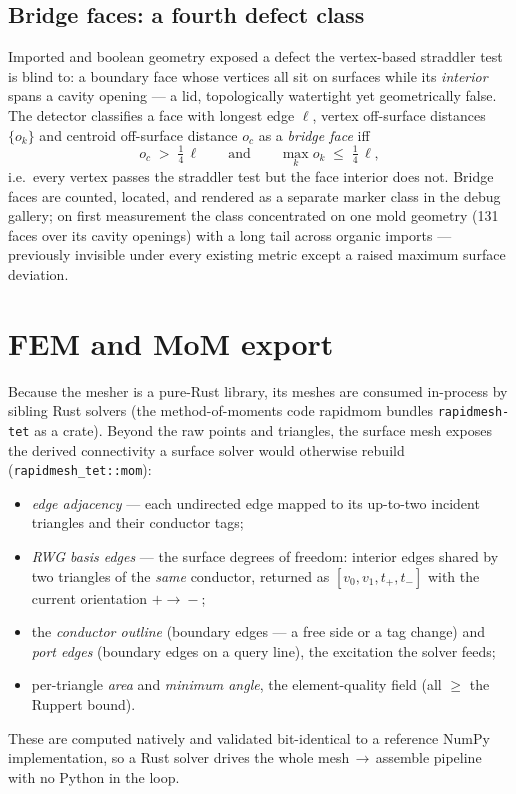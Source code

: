 \documentclass[11pt,a4paper]{article}
\numberwithin{equation}{section}
\DeclareRobustCommand{\code}[1]{\texttt{#1}}
\begin{document}
\subsection{Bridge faces: a fourth defect class}
Imported and boolean geometry exposed a defect the vertex-based straddler test
is blind to: a boundary face whose vertices all sit on surfaces while its
\emph{interior} spans a cavity opening --- a lid, topologically watertight yet
geometrically false. The detector classifies a face with longest edge
$\ell$, vertex off-surface distances $\{o_k\}$ and centroid off-surface
distance $o_c$ as a \emph{bridge face} iff
\begin{equation}
o_c \;>\; \tfrac{1}{4}\,\ell
\qquad\text{and}\qquad
\max_k o_k \;\le\; \tfrac{1}{4}\,\ell ,
\label{eq:bridge}
\end{equation}
i.e.\ every vertex passes the straddler test but the face interior does not.
Bridge faces are counted, located, and rendered as a separate marker class in
the debug gallery; on first measurement the class concentrated on one mold
geometry (131 faces over its cavity openings) with a long tail across organic
imports --- previously invisible under every existing metric except a raised
maximum surface deviation.

\section{FEM and MoM export}
\label{sec:export}
Because the mesher is a pure-Rust library, its meshes are consumed in-process by
sibling Rust solvers (the method-of-moments code \textsf{rapidmom} bundles
\code{rapidmesh-tet} as a crate). Beyond the raw points and triangles, the surface
mesh exposes the derived connectivity a surface solver would otherwise rebuild
(\code{rapidmesh\_tet::mom}):
\begin{itemize}[nosep,leftmargin=1.4em]
  \item \emph{edge adjacency} --- each undirected edge mapped to its up-to-two
        incident triangles and their conductor tags;
  \item \emph{RWG basis edges} --- the surface degrees of freedom: interior edges
        shared by two triangles of the \emph{same} conductor, returned as
        $[v_0,v_1,t_+,t_-]$ with the current orientation $+\!\to\!-$;
  \item the \emph{conductor outline} (boundary edges --- a free side or a tag
        change) and \emph{port edges} (boundary edges on a query line), the
        excitation the solver feeds;
  \item per-triangle \emph{area} and \emph{minimum angle}, the element-quality
        field (all $\ge$ the Ruppert bound).
\end{itemize}
These are computed natively and validated bit-identical to a reference NumPy
implementation, so a Rust solver drives the whole mesh\,$\to$\,assemble pipeline
with no Python in the loop.
\end{document}
